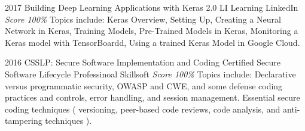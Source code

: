 \documentclass[11pt,a4paper]{moderncv}
\begin{document}
\cventry
    {2017}
    {Building Deep Learning Applications with Keras 2.0}
    {LI Learning}
    {LinkedIn}
    {\textit{Score 100\%}}
    {
        Topics include:                                                          %
            Keras Overview,                                                      %
            Setting Up,                                                          %
            Creating a Neural Network in Keras,                                  %
            Training Models,                                                     %
            Pre-Trained Models in Keras,                                         %
            Monitoring a Keras model with TensorBoardd,                          %
            Using a trained Keras Model in Google Cloud.                         %
    }

\cventry
    {2016}
    {CSSLP: Secure Software Implementation and Coding}
    {Certified Secure Software Lifecycle Professinoal}
    {Skillsoft}
    {\textit{Score 100\%}}
    {
        Topics include:                                                          %
            Declarative versus programmatic security,                            %
            OWASP and CWE,                                                       %
            and some defense coding practices and controls,                      %
            error handling,                                                      %
            and session management.                                              %
            Essential secure coding techniques (                                 %
                versioning,                                                      %
                peer-based code reviews,                                         %
                code analysis,                                                   %
                and anti-tampering techniques                                    %
            ).                                                                   %
    }
\end{document}
